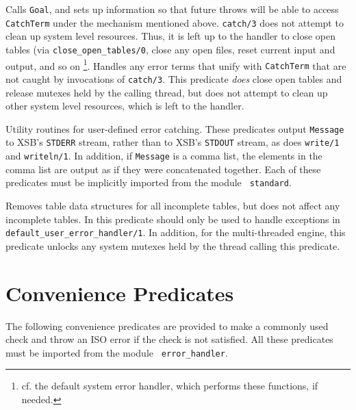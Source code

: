\begin{description}
 
Calls {\tt Goal}, and sets up information so that future throws will
be able to access {\tt CatchTerm} under the mechanism mentioned
above. {\tt catch/3} does not attempt to clean up system level
resources.  Thus, it is left up to the handler to close open tables
(via {\tt close\_open\_tables/0}, close any open files, reset current
input and output, and so on \footnote{cf. the default system error
  handler, which performs these functions, if needed.}.
%
 Handles any error
terms that unify with {\tt CatchTerm} that are not caught by
invocations of {\tt catch/3}.  This predicate {\em does} close open
tables and release mutexes held by the calling thread, but does not
attempt to clean up other system level resources, which is left to the
handler.
%
\vspace{-0.3in}

Utility routines for user-defined error catching.  These predicates
output {\tt Message} to XSB's {\tt STDERR} stream, rather than to
XSB's {\tt STDOUT} stream, as does {\tt write/1} and {\tt writeln/1}.
In addition, if {\tt Message} is a comma list, the elements in the
comma list are output as if they were concatenated together.  Each of
these predicates must be implicitly imported from the module {\tt
standard}.

%
Removes table data structures for all incomplete tables, but does not
affect any incomplete tables.  In \version{} this predicate should
only be used to handle exceptions in {\tt
  default\_user\_error\_handler/1}.  In addition, for the
multi-threaded engine, this predicate unlocks any system mutexes held
by the thread calling this predicate.

\end{description}

\section{Convenience Predicates}

The following convenience predicates are provided to make a commonly
used check and throw an ISO error if the check is not satisfied.  All
these predicates must be imported from the module {\tt
  error\_handler}.

